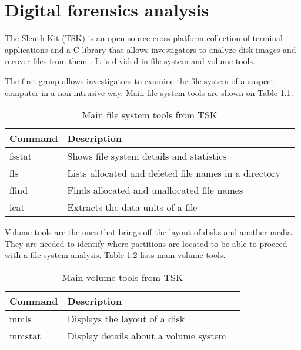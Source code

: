 \chapter{Digital forensics analysis}
\label{S:df-analysis}

The Sleuth Kit (TSK) is an open source cross-platform collection of terminal
applications and a C library that allows investigators to analyze disk images
and recover files from them \cite{tsk-web}. It is divided in file system and
volume tools. 

The first group allows investigators to examine the file system of a suspect
computer in a non-intrusive way. Main file system tools are shown on Table
\ref{T:tsk-fs-tools}.

\begin{table}[htb]
\begin{center}
\begin{tabular}{|l|l|l|}
\hline
{\bf Command }	& {\bf Description }  \\ \hline \hline
fsstat & Shows file system details and statistics \\ \hline \hline
fls	& Lists allocated and deleted file names in a directory \\ \hline
ffind & Finds allocated and unallocated file names \\ \hline \hline
icat & Extracts the data units of a file \\ \hline
\end{tabular}
\caption{Main file system tools from TSK \cite{tsk-tools-wiki}}
\label{T:tsk-fs-tools}
\end{center}
\end{table}

Volume tools are the ones that brings off the layout of disks and another media.
They are needed to identify where partitions are located to be able to proceed
with a file system analysis. Table \ref{T:tsk-v-tools} lists main volume tools.

\begin{table}[htb]
\begin{center}
\begin{tabular}{|l|l|l|}
\hline
{\bf Command }	& {\bf Description }  \\ \hline \hline
mmls & Displays the layout of a disk \\ \hline \hline
mmstat & Display details about a volume system \\ \hline
\end{tabular}
\caption{Main volume tools from TSK \cite{tsk-tools-wiki}}
\label{T:tsk-v-tools}
\end{center}
\end{table}

